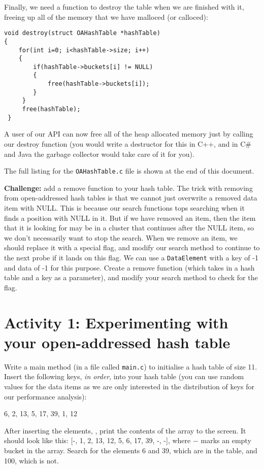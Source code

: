 \documentclass[10pt, a4paper, twosize]{article}
\begin{document}
Finally, we need a function to destroy the table when we are finished with it, freeing up all of the memory that we have malloced (or calloced):
\begin{lstlisting}
void destroy(struct OAHashTable *hashTable)
{
	for(int i=0; i<hashTable->size; i++)
	{
		if(hashTable->buckets[i] != NULL)
		{
			free(hashTable->buckets[i]);
		}
 	 }
 	 free(hashTable);
 }
\end{lstlisting}
A user of our API can now free all of the heap allocated memory just by calling our destroy function (you would write a destructor for this in C++, and in C\# and Java the garbage collector would take care of it for you).

The full listing for the \texttt{OAHashTable.c} file is shown at the end of this document.

\textbf{Challenge:} add a remove function to your hash table. The trick with removing from open-addressed hash tables is that we cannot just overwrite a removed data item with NULL. This is because our search functions tops searching when it finds a position with NULL in it. But if we have removed an item, then the item that it is looking for may be in a cluster that continues after the NULL item, so we don't necessarily want to stop the search. When we remove an item, we should replace it with a special flag, and modify our search method to continue to the next probe if it lands on this flag. We can use a \texttt{DataElement} with a key of -1 and data of -1 for this purpose. Create a remove function (which takes in a hash table and a key as a parameter), and modify your search method to check for the flag.

\section{Activity 1: Experimenting with your open-addressed hash table}
Write a main method (in a file called \texttt{main.c}) to initialise a hash table of size 11. Insert the following keys, \emph{in order}, into your hash table (you can use random values for the data items as we are only interested in the distribution of keys for our performance analysis):

6, 2, 13, 5, 17, 39, 1, 12

After inserting the elements, , print the contents of the array to the screen. It should look like this: [-, 1, 2, 13, 12, 5, 6, 17, 39, -, -], where $-$ marks an empty bucket in the array. Search for the elements 6 and 39, which are in the table, and 100, which is not.
 
\end{document}
